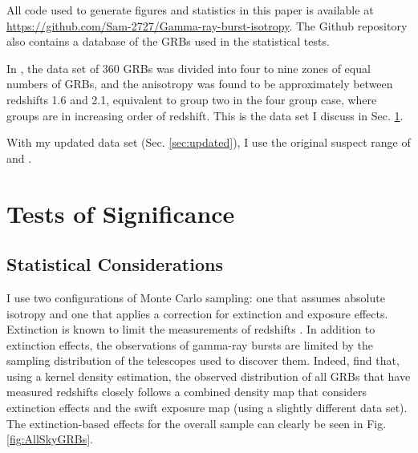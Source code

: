 \documentclass[fleqn,usenatbib]{mnras}
\begin{document}
All code used to generate figures and statistics in this paper is available at \hyperlink{https://github.com/Sam-2727/Gamma-ray-burst-isotropy}{https://github.com/Sam-2727/Gamma-ray-burst-isotropy}. The Github repository also contains a database of the GRBs used in the statistical tests.

In \citet{horvath2015}, the data set of 360 GRBs was divided into four to nine zones of equal numbers of GRBs, and the anisotropy was found to be approximately between redshifts 1.6 and 2.1, equivalent to group two in the four group case, where groups are in increasing order of redshift. This is the data set I discuss in Sec. \ref{sec:significance}.

With my updated data set (Sec. \ref{sec:updated}), I use the original suspect range of \citet{horvath2014} and \citet{horvath2015}.
\section{Tests of Significance}
\label{sec:significance}
\subsection{Statistical Considerations}
\label{sec:statisticalconsiderations}
I use two configurations of Monte Carlo sampling: one that assumes absolute isotropy and one that applies a correction for extinction and exposure effects. Extinction is known to limit the measurements of redshifts \citep{horvath2015}. In addition to extinction effects, the observations of gamma-ray bursts are limited by the sampling distribution of the telescopes used to discover them. Indeed, \citet{ukwatta2016} find that, using a kernel density estimation, the observed distribution of all GRBs that have measured redshifts closely follows a combined density map that considers extinction effects and the swift exposure map (using a slightly different data set). The extinction-based effects for the overall sample can clearly be seen in Fig. \ref{fig:AllSkyGRBs}.
\end{document}

